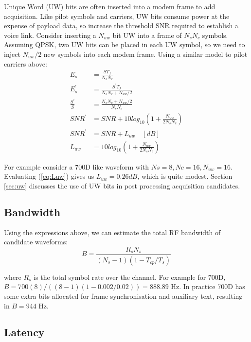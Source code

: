 \documentclass{article}
\begin{document}
Unique Word (UW) bits are often inserted into a modem frame to add acquisition.  Like pilot symbols and carriers, UW bits consume power at the expense of payload data, so increase the threshold SNR required to establish a voice link.  Consider inserting a $N_{uw}$ bit UW into a frame of $N_sN_c$ symbols.  Assuming QPSK, two UW bits can be placed in each UW symbol, so we need to inject $N_{uw}/2$ new symbols into each modem frame.  Using a similar model to pilot carriers above:
\begin{equation}
\label{eq:Luw}
\begin{split}
E_s &= \frac{ST_f}{N_sN_c} \\
E^\prime_s &= \frac{S^\prime T_f}{N_sN_c+N_{uw}/2} \\
\frac{S^\prime}{S} &= \frac{N_sN_c+N_{uw}/2}{N_sN_c} \\
SNR^\prime &= SNR + 10log_{10}\left(1 + \frac{N_{uw}}{2N_sN_c}\right)  \\
SNR^\prime &= SNR + L_{uw}  \quad [\si{dB}] \\
L_{uw} &= 10log_{10}\left(1 + \frac{N_{uw}}{2N_sN_c}\right) 
\end{split}
\end{equation}

For example consider a 700D like waveform with $Ns=8,Nc=16,N_{uw}=16$. Evaluating (\ref{eq:Luw}) gives us $L_{uw}=0.26 \si{dB}$, which is quite modest. Section \ref{sec:uw} discusses the use of UW bits in post processing acquisition candidates.

\subsection{Bandwidth}

Using the expressions above, we can estimate the total RF bandwidth of candidate waveforms:
\begin{equation}
B = \frac{R_sN_s}{(N_s-1)(1-T_{cp}/T_s)}
\end{equation}

where $R_s$ is the total symbol rate over the channel.  For example for 700D, $B = 700(8)/((8-1)(1-0.002/0.02))=888.89$ Hz.  In practice 700D has some extra bits allocated for frame synchronisation and auxiliary text, resulting in $B=944$ Hz.

\subsection{Latency}
\label{sec:latency}
\end{document}
